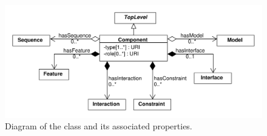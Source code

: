 \begin{figure}[ht]
\begin{center}
\includegraphics[scale=0.6]{sbol_uml/component}
\caption[]{Diagram of the  class and its associated properties.}
\label{uml:component}
\end{center}
\end{figure} 

